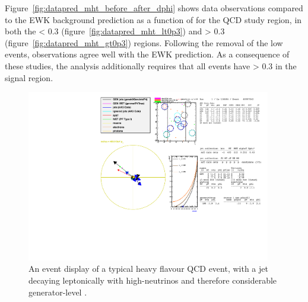 Figure~\ref{fig:datapred_mht_before_after_dphi} shows data observations
compared to the EWK background prediction as a
function of \mht for the QCD study region, in both the
\mindphistar < 0.3 (figure~\ref{fig:datapred_mht_lt0p3}) and
\mindphistar > 0.3 (figure~\ref{fig:datapred_mht_gt0p3}) regions. Following the
removal of the low \mindphistar events, observations agree well with the EWK
prediction. As a consequence of these studies, the analysis additionally
requires that all
events have \mindphistar > 0.3 in the signal region.


\clearpage
\begin{figure}
    \centering
    \includegraphics[width=0.95\textwidth]
    {Figs/eventDisplays/Had_QCD_MG_MC_HT375_skim_displays_singleEvent_2_noPF.pdf}
    \caption{An event display of a typical heavy flavour QCD event, with a jet
    decaying leptonically with high-\Pt neutrinos and therefore considerable
    generator-level \met.}
    \label{fig:event_display_QCD}
\end{figure}






